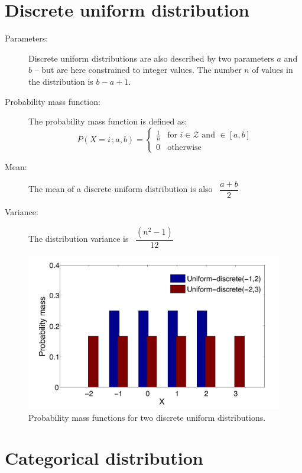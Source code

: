 \section*{Discrete uniform distribution}

\begin{description}
\item [Parameters: ] Discrete uniform distributions are also described by two parameters $a$ and $b$ -- but are here constrained to integer values. The number $n$ of values in the distribution is $b-a+1$. 

\item [Probability mass function: ] The probability mass function is defined as:
\begin{equation}
P(X\!=\!i\,; a, b) = \begin{cases}
\frac{1}{n} & \text{for } i \in \mathcal{Z} \text{ and } \in [a,b]  \\
0               & \text{otherwise}
\end{cases}
\end{equation} 
\item [Mean: ] The mean of a discrete uniform distribution is also \  $\dfrac{a+b}{2}$

\item [Variance: ] The distribution variance is \ $\dfrac{(n^2 -1)}{12}$
\end{description}

\begin{figure}[h]
\centering
\includegraphics[scale=0.40]{imgs/uniformd-appendix.pdf}
\caption{Probability mass functions for two discrete uniform distributions.} 
\label{fig:uniformd-appendix}
\end{figure}

\section*{Categorical distribution}

